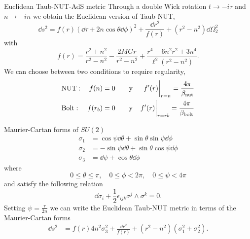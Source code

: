 \documentclass[aspectratio=169,xcolor=dvipsnames]{beamer}
\begin{document}
\begin{frame}{Euclidean Taub-NUT-AdS metric}\justifying
Through a double Wick rotation $t\to -i\tau$ and $n\to -in$ we obtain the Euclidean version of Taub-NUT,
\begin{equation*}
    \dd s^2=f(r)(\dd \tau+2n\cos\theta\dd\phi)^2+\frac{\dd r^2}{f(r)}+(r^2-n^2)\dd\Omega^2_2
\end{equation*}
with
\begin{equation*}
    f(r)=\frac{r^2+n^2}{r^2-n^2}-\frac{2MGr}{r^2-n^2}+\frac{r^4-6n^2r^2+3n^4}{\ell^2(r^2-n^2)}.
\end{equation*}
We can choose between two conditions to require regularity,
\begin{align*}
    &\rm NUT:&f(n)=0&\qquad \rm y&\eval{f'(r)}_{r=n}=\frac{4\pi}{\beta_{\rm nut}}\\
    &\rm Bolt:&f(r_b)=0&\qquad \rm y&\eval{f'(r)}_{r=rb}=\frac{4\pi}{\beta_{\rm bolt}}
\end{align*}
\end{frame}


\begin{frame}{Maurier-Cartan forms of $SU(2)$}\justifying
    \begin{align*}
        \sigma_1&=\cos\psi\dd\theta + \sin\theta\sin\psi\dd\phi\\
        \sigma_2&=-\sin\psi\dd\theta+\sin\theta\cos\psi\dd\phi\\
        \sigma_3&=\dd\psi + \cos\theta\dd\phi
    \end{align*}
where
\begin{equation*}
    0\leq \theta\leq \pi,\quad 0\leq\phi<2\pi,\quad 0\leq\psi<4\pi
\end{equation*}
and satisfy the following relation
\begin{equation*}
    \dd\sigma_i+\frac{1}{2}\epsilon_{ijk}\sigma^j\wedge \sigma^k=0.
\end{equation*}
Setting $\psi=\frac{\tau}{2n}$ we can write the Euclidean Taub-NUT metric in terms of the Maurier-Cartan forms
    \begin{align*}
        \dd s^2
        &=f(r)4n^2\sigma_3^2+\frac{\dd r^2}{f(r)}+(r^2-n^2)(\sigma_1^2+\sigma_2^2).
    \end{align*} 
\end{frame}
\end{document}
